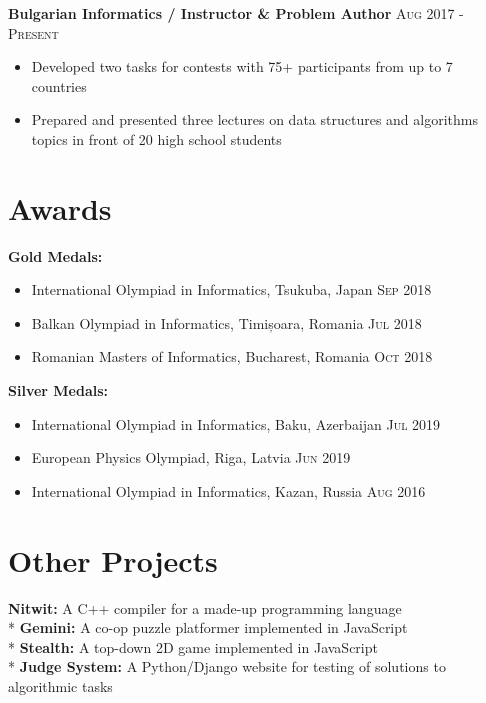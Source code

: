 \documentclass[letterpaper,11pt]{article}
\newcommand{\noskip}{\vspace{-\parskip}}
\newcommand{\doskip}{\vspace{\parskip}}
\begin{document}
\textbf{Bulgarian Informatics / Instructor \& Problem Author}
\hfill
\textsc{Aug 2017 - Present}
\noskip
\begin{itemize}
    \item Developed two tasks for contests with 75+ participants from up to 7
        countries
    \item Prepared and presented three lectures on data structures and
        algorithms topics in front of 20 high school students
\end{itemize}

\section*{Awards}
\textbf{Gold Medals:}
\noskip
\begin{itemize}
    \item International Olympiad in Informatics, Tsukuba, Japan
        \hfill \textsc{Sep 2018}
    \item Balkan Olympiad in Informatics, Timișoara, Romania
        \hfill \textsc{Jul 2018}
    \item Romanian Masters of Informatics, Bucharest, Romania
        \hfill \textsc{Oct 2018}
\end{itemize}

\textbf{Silver Medals:}
\noskip
\begin{itemize}
    \item International Olympiad in Informatics, Baku, Azerbaijan
        \hfill \textsc{Jul 2019}
    \item European Physics Olympiad, Riga, Latvia
        \hfill \textsc{Jun 2019}
    \item International Olympiad in Informatics, Kazan, Russia
        \hfill \textsc{Aug 2016}
\end{itemize}

\section*{Other Projects}
\textbf{Nitwit:} A C++ compiler for a made-up programming language\\*
\textbf{Gemini:} A co-op puzzle platformer implemented in JavaScript\\*
\textbf{Stealth:} A top-down 2D game implemented in JavaScript\\*
\textbf{Judge System:} A Python/Django website for testing of solutions
to algorithmic tasks
\end{document}
